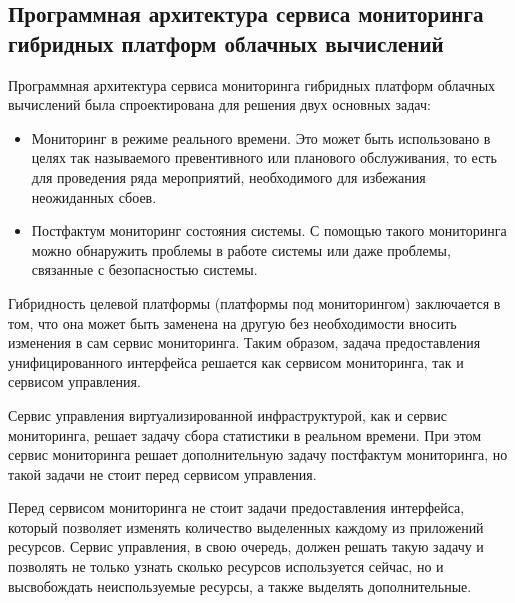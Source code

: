 \subsection{Программная архитектура сервиса мониторинга гибридных платформ облачных вычислений}
Программная архитектура сервиса мониторинга гибридных платформ облачных вычислений \cite{hybrid-cloud-computing-monitoring-software-architecture} была спроектирована для решения двух основных задач:
\begin{itemize} 
    \item Мониторинг в режиме реального времени. Это может быть использовано в целях так называемого превентивного или планового обслуживания, то есть для проведения ряда мероприятий, необходимого для избежания неожиданных сбоев.
    \item Постфактум мониторинг состояния системы. С помощью такого мониторинга можно обнаружить проблемы в работе системы или даже проблемы, связанные с безопасностью системы.
\end{itemize} 
Гибридность целевой платформы (платформы под мониторингом) заключается в том, что она может быть заменена на другую без необходимости вносить изменения в сам сервис мониторинга. 
Таким образом, задача предоставления унифицированного интерфейса решается как сервисом мониторинга, так и сервисом управления.

Сервис управления виртуализированной инфраструктурой, как и сервис мониторинга, решает задачу сбора статистики в реальном времени. 
При этом сервис мониторинга решает дополнительную задачу постфактум мониторинга, но такой задачи не стоит перед сервисом управления.

Перед сервисом мониторинга не стоит задачи предоставления интерфейса, который позволяет изменять количество выделенных каждому из приложений ресурсов. 
Сервис управления, в свою очередь, должен решать такую задачу и позволять не только узнать сколько ресурсов используется сейчас, но и высвобождать неиспользуемые ресурсы, а также выделять дополнительные.